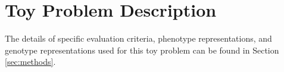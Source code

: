 \section{Toy Problem Description} \label{sec:problem-description}


The details of specific evaluation criteria, phenotype representations, and genotype representations used for this toy problem can be found in Section \ref{sec:methods}.
